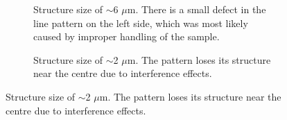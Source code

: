 \begin{figure}[!t]	
     \centering
     \begin{subfigure}[t]{0.32\linewidth}
  	\centering
  	\caption{Structure size of $\sim$6 $\mu$m. There is a small defect in the line pattern on the left side, which was most likely caused by improper handling of the sample.}
  	\label{fig:b2d1_q1}
  \end{subfigure}
 \hfill
     \begin{subfigure}[t]{0.32\linewidth}
  	\centering
  	\caption{Structure size of $\sim$2 $\mu$m. The pattern loses its structure near the centre due to interference effects.}

\end{subfigure}
\end{figure}
